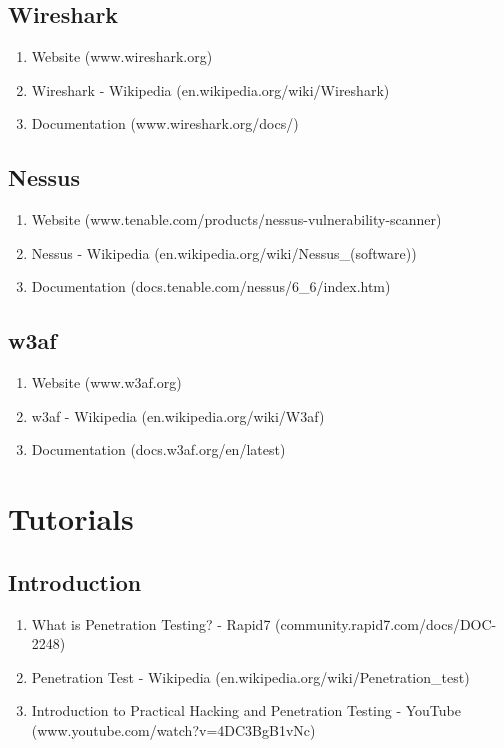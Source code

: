\documentclass[a4paper]{article}
\begin{document}
\subsection{Wireshark}
\begin{enumerate}
	\item Website (www.wireshark.org)
	\item Wireshark - Wikipedia (en.wikipedia.org/wiki/Wireshark)
    \item Documentation (www.wireshark.org/docs/)
\end{enumerate}

\subsection{Nessus}
\begin{enumerate}
	\item Website (www.tenable.com/products/nessus-vulnerability-scanner)
	\item Nessus - Wikipedia (en.wikipedia.org/wiki/Nessus\_(software))
    \item Documentation (docs.tenable.com/nessus/6\_6/index.htm)
\end{enumerate}

\subsection{w3af}
\begin{enumerate}
	\item Website (www.w3af.org)
	\item w3af - Wikipedia (en.wikipedia.org/wiki/W3af)
    \item Documentation (docs.w3af.org/en/latest)
\end{enumerate}


\section{Tutorials}

\subsection{Introduction}
\begin{enumerate}
	\item What is Penetration Testing? - Rapid7 (community.rapid7.com/docs/DOC-2248)
	\item Penetration Test - Wikipedia (en.wikipedia.org/wiki/Penetration\_test)
    \item Introduction to Practical Hacking and Penetration Testing - YouTube \\(www.youtube.com/watch?v=4DC3BgB1vNc)
\end{enumerate}
\end{document}

